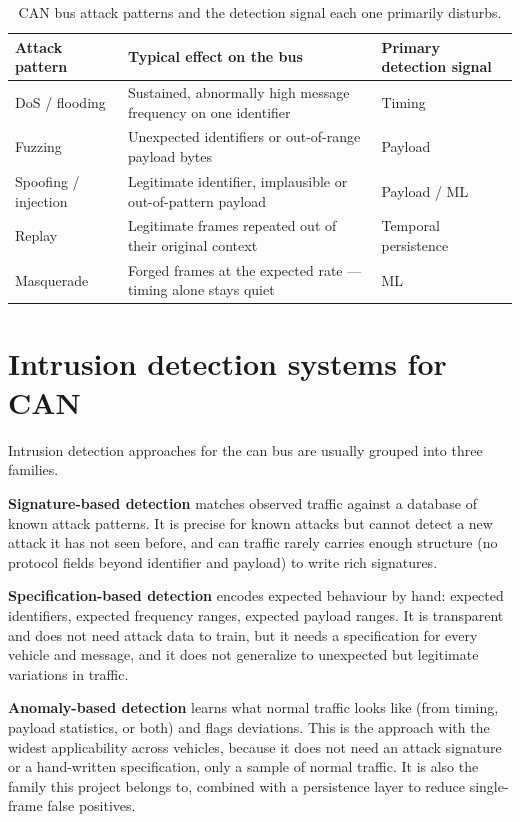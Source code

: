 \begin{table}[H]
\centering
\caption{CAN bus attack patterns and the detection signal each one primarily disturbs.}
\label{tab:attack-comparison}
\begin{tabularx}{\textwidth}{@{}lXl@{}}
\toprule
\textbf{Attack pattern} & \textbf{Typical effect on the bus} & \textbf{Primary detection signal} \\
\midrule
DoS / flooding    & Sustained, abnormally high message frequency on one identifier & Timing \\
Fuzzing           & Unexpected identifiers or out-of-range payload bytes & Payload \\
Spoofing / injection & Legitimate identifier, implausible or out-of-pattern payload & Payload / ML \\
Replay            & Legitimate frames repeated out of their original context & Temporal persistence \\
Masquerade        & Forged frames at the expected rate — timing alone stays quiet & ML \\
\bottomrule
\end{tabularx}
\end{table}

\section{Intrusion detection systems for CAN}

Intrusion detection approaches for the \gls{can} bus are usually grouped into three families.

\textbf{Signature-based detection} matches observed traffic against a database of known attack patterns. It is precise for known attacks but cannot detect a new attack it has not seen before, and \gls{can} traffic rarely carries enough structure (no protocol fields beyond identifier and payload) to write rich signatures.

\textbf{Specification-based detection} encodes expected behaviour by hand: expected identifiers, expected frequency ranges, expected payload ranges. It is transparent and does not need attack data to train, but it needs a specification for every vehicle and message, and it does not generalize to unexpected but legitimate variations in traffic.

\textbf{Anomaly-based detection} learns what normal traffic looks like (from timing, payload statistics, or both) and flags deviations. This is the approach with the widest applicability across vehicles, because it does not need an attack signature or a hand-written specification, only a sample of normal traffic. It is also the family this project belongs to, combined with a persistence layer to reduce single-frame false positives.

